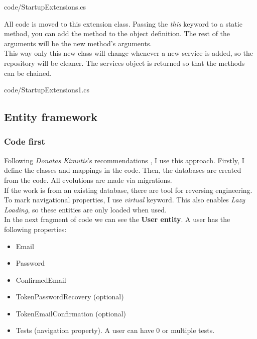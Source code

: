         
        {code/StartupExtensions.cs}

        All code is moved to this extension class. Passing the \textit{this} keyword to a static method, you can add the method to the object definition. The rest of the arguments will be the new method's arguments. \\
        This way only this new class will change whenever a new service is added, so the repository will be cleaner. The services object is returned so that the methods can be chained.
        
        {code/StartupExtensions1.cs}

    \subsection{Entity framework}
        \subsubsection{Code first}
        Following \textit{Donatas Kimutis}'s recommendations \cite{Kimutis}, I use this approach. Firstly, I define the classes and mappings in the code. Then, the databases are created from the code. All evolutions are made via migrations. \\
        If the work is from an existing database, there are tool for reversing engineering. \\

        To mark navigational properties, I use \textit{virtual} keyword. This also enables \textit{Lazy Loading}, so these entities are only loaded when used. \\

        In the next fragment of code we can see the \textbf{User entity}. A user has the following properties:
        \begin{itemize}[noitemsep]
            \item Email
            \item Password
            \item ConfirmedEmail
            \item TokenPasswordRecovery (optional)
            \item TokenEmailConfirmation (optional)
            \item Tests (navigation property). A user can have 0 or multiple tests.
        \end{itemize}

